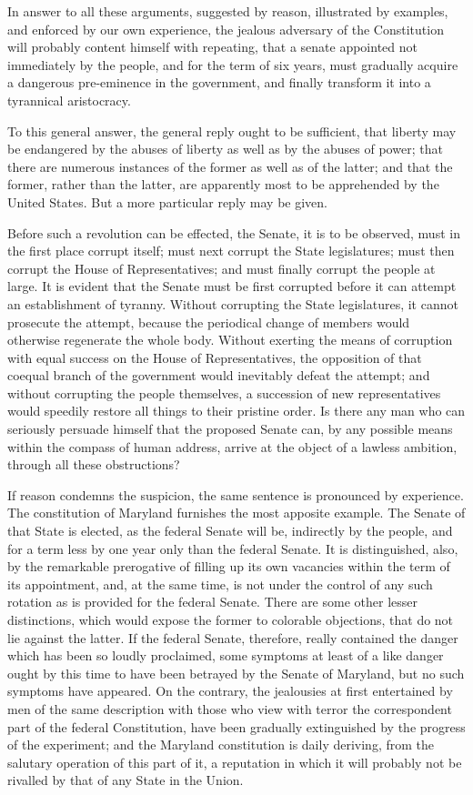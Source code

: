 In answer to all these arguments, suggested by reason, illustrated by examples, and enforced by our own experience, the jealous adversary of the Constitution will probably content himself with repeating, that a senate appointed not immediately by the people, and for the term of six years, must gradually acquire a dangerous pre-eminence in the government, and finally transform it into a tyrannical aristocracy.

To this general answer, the general reply ought to be sufficient, that liberty may be endangered by the abuses of liberty as well as by the abuses of power; that there are numerous instances of the former as well as of the latter; and that the former, rather than the latter, are apparently most to be apprehended by the United States. But a more particular reply may be given.

Before such a revolution can be effected, the Senate, it is to be observed, must in the first place corrupt itself; must next corrupt the State legislatures; must then corrupt the House of Representatives; and must finally corrupt the people at large. It is evident that the Senate must be first corrupted before it can attempt an establishment of tyranny. Without corrupting the State legislatures, it cannot prosecute the attempt, because the periodical change of members would otherwise regenerate the whole body. Without exerting the means of corruption with equal success on the House of Representatives, the opposition of that coequal branch of the government would inevitably defeat the attempt; and without corrupting the people themselves, a succession of new representatives would speedily restore all things to their pristine order. Is there any man who can seriously persuade himself that the proposed Senate can, by any possible means within the compass of human address, arrive at the object of a lawless ambition, through all these obstructions?

If reason condemns the suspicion, the same sentence is pronounced by experience. The constitution of Maryland furnishes the most apposite example. The Senate of that State is elected, as the federal Senate will be, indirectly by the people, and for a term less by one year only than the federal Senate. It is distinguished, also, by the remarkable prerogative of filling up its own vacancies within the term of its appointment, and, at the same time, is not under the control of any such rotation as is provided for the federal Senate. There are some other lesser distinctions, which would expose the former to colorable objections, that do not lie against the latter. If the federal Senate, therefore, really contained the danger which has been so loudly proclaimed, some symptoms at least of a like danger ought by this time to have been betrayed by the Senate of Maryland, but no such symptoms have appeared. On the contrary, the jealousies at first entertained by men of the same description with those who view with terror the correspondent part of the federal Constitution, have been gradually extinguished by the progress of the experiment; and the Maryland constitution is daily deriving, from the salutary operation of this part of it, a reputation in which it will probably not be rivalled by that of any State in the Union.

